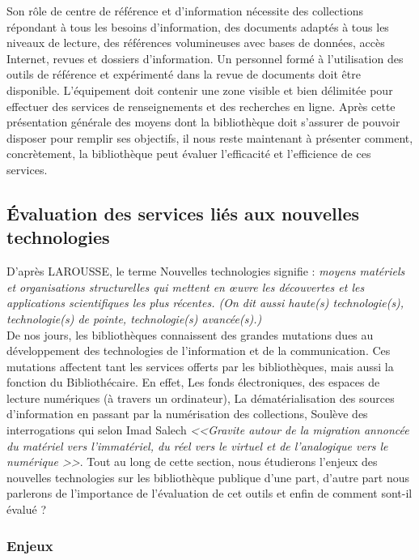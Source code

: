 \documentclass[french,a4paper,12pt]{article}
\begin{document}
\quad Son rôle de centre de référence et d'information nécessite des collections répondant à tous les besoins d'information, des documents adaptés à tous les niveaux de lecture, des références volumineuses avec bases de données, accès Internet, revues et dossiers d'information. Un personnel formé à l'utilisation des outils de référence et expérimenté dans la revue de documents doit être disponible. L'équipement doit contenir une zone visible et bien délimitée pour effectuer des services de renseignements et des recherches en ligne. 
Après cette présentation générale des moyens dont la bibliothèque doit s’assurer de pouvoir disposer pour remplir ses objectifs, il nous reste maintenant à présenter comment, concrètement, la bibliothèque peut évaluer l’efficacité et l’efficience de ces services. 





\subsection{Évaluation des services liés aux nouvelles technologies}
\quad D'après LAROUSSE, le terme Nouvelles technologies signifie :\textit{ moyens matériels et organisations structurelles qui mettent en œuvre les découvertes et les applications scientifiques les plus récentes. (On dit aussi haute(s) technologie(s), technologie(s) de pointe, technologie(s) avancée(s).)}\\

\quad De nos jours, les bibliothèques connaissent des grandes mutations dues au développement des technologies de l'information et de la communication. Ces mutations affectent tant les services offerts par les bibliothèques, mais aussi la fonction du Bibliothécaire. En effet, Les fonds électroniques, des espaces de lecture numériques (à travers un ordinateur), La dématérialisation des sources d'information en passant par la numérisation des collections, Soulève des interrogations qui selon Imad Salech \textit{<<Gravite autour de la migration annoncée du matériel vers l'immatériel, du réel vers le virtuel et de l'analogique vers le numérique >>}\citep{saleh_bibliotheques_2009}. Tout au long de cette section, nous étudierons l’enjeux  des nouvelles technologies  sur les bibliothèque publique d’une part, d’autre part nous parlerons de l’importance de l’évaluation de cet outils  et enfin de comment sont-il évalué ?

\subsubsection{Enjeux} 
\end{document}
